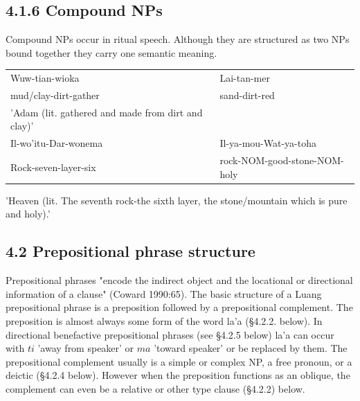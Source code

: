 \documentclass[10pt]{article}
\begin{document}
\subsection*{4.1.6 Compound NPs}
Compound NPs occur in ritual speech. Although they are structured as two NPs bound together they carry one semantic meaning.

\begin{center}
\begin{tabular}{ll}
Wuw-tian-wioka & Lai-tan-mer \\
mud/clay-dirt-gather & sand-dirt-red \\
'Adam (lit. gathered and made from dirt and clay)' &  \\
Il-wo'itu-Dar-wonema & Il-ya-mou-Wat-ya-toha \\
Rock-seven-layer-six & rock-NOM-good-stone-NOM-holy \\
\end{tabular}
\end{center}

'Heaven (lit. The seventh rock-the sixth layer, the stone/mountain which is pure and holy).'

\subsection*{4.2 Prepositional phrase structure}
Prepositional phrases "encode the indirect object and the locational or directional information of a clause" (Coward 1990:65). The basic structure of a Luang prepositional phrase is a preposition followed by a prepositional complement. The preposition is almost always some form of the word la'a (§4.2.2. below). In directional benefactive prepositional phrases (see §4.2.5 below) la'a can occur with \(t i\) 'away from speaker' or \(m a\) 'toward speaker' or be replaced by them. The prepositional complement usually is a simple or complex NP, a free pronoun, or a deictic (§4.2.4 below). However when the preposition functions as an oblique, the complement can even be a relative or other type clause (§4.2.2) below.
\end{document}
